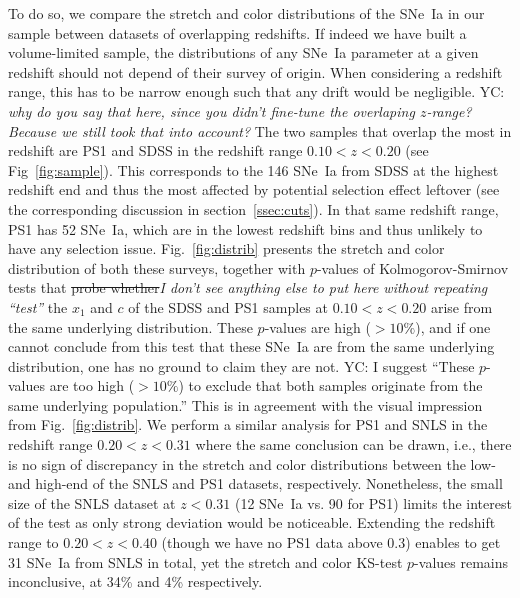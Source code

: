 \documentclass[]{aa}
\newcommand{\nn}[1]{\textcolor[rgb]{0.4, 0.8, 0}{#1}}
\newcommand{\yc}[1]{\textcolor[RGB]{217, 22, 102}{#1}}
\begin{document}
To do so, we compare the stretch and color distributions of the SNe~Ia in our
sample between datasets of overlapping redshifts. If indeed we have built a
volume-limited sample, the distributions of any SNe~Ia parameter at a given
redshift should not depend of their survey of origin. When considering a
redshift range, this has to be narrow enough such that any drift would be
negligible. \yc{YC: \textit{why do you say that here, since you didn't fine-tune
the overlaping $z$-range?}} \nn{\textit{Because we still took that into
account?}} The two samples that overlap the most in redshift are PS1 and SDSS in
the redshift range $0.10 < z < 0.20$ (see Fig~\ref{fig:sample}). This
corresponds to the 146 SNe~Ia from SDSS at the highest redshift end and thus the
most affected by potential selection effect leftover (see the corresponding
discussion in section~\ref{ssec:cuts}). In that same redshift range, PS1 has 52
SNe~Ia, which are in the lowest redshift bins and thus unlikely to have any
selection issue. Fig.~\ref{fig:distrib} presents the stretch and color
distribution of both \nn{these surveys}, together with $p$-values of
Kolmogorov-Smirnov tests that \yc{\sout{\nn{probe whether}}}\nn{\textit{I don't
see anything else to put here without repeating ``test''}} the $x_1$ and $c$ of
the SDSS and PS1 samples at $0.10 < z < 0.20$ arise from the same underlying
distribution. These $p$-values are high ($>10\%$), and if one cannot conclude
from this test that these SNe~Ia are from the same underlying distribution, one
has no ground to claim they are not. \yc{YC: I suggest ``These $p$-values are
too high ($>10\%$) to exclude that both samples originate from the same
underlying population.''} This is in agreement with the visual impression from
Fig.~\ref{fig:distrib}. We perform a similar analysis for PS1 and SNLS in the
redshift range $0.20 < z < 0.31$ where the same conclusion can be drawn, i.e.,
there is no sign of discrepancy in the stretch and color distributions between
the low- and high-end of the SNLS and PS1 datasets, respectively. Nonetheless,
the small size of the SNLS dataset at $z < 0.31$ (12 SNe~Ia vs. 90 for PS1)
limits the interest of the test as only strong deviation would be noticeable.
Extending the redshift range to $0.20 < z < 0.40$ (though we have no PS1 data
above 0.3) enables to get 31 SNe~Ia from SNLS in total, yet the stretch and
color KS-test $p$-values remains inconclusive, at 34\% and 4\% respectively.
\end{document}
